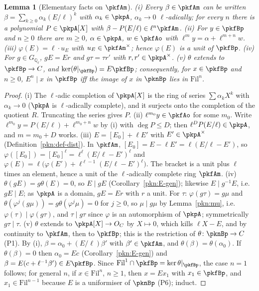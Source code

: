 \documentclass[10pt]{amsart}
\newtheorem{lemma}[theorem]{Lemma}
\theoremstyle{definition}
\theoremstyle{remark}
\newcommand{\Q}{\mathbb Q}
\begin{document}
\begin{lemma}[Elementary facts on $\pkfAm$]\label{pkf:approx0}
(i) Every $\beta\in\pkfAm$ can be written $\beta=\sum_{k\ge0}\alpha_k(E/\ell)^k$ with $\alpha_k\in\pkpA$,
$\alpha_k\to0$ $\ell$-adically; for every $n$ there is a polynomial $P\in\pkpA[X]$ with
$\beta-P(E/\ell)\in\ell^n\pkfAm$. (ii) For $y\in\pkfBp$ and $n\ge0$ there are $m\ge0$, $\alpha\in\pkpA$,
$w\in\pkfAo$ with $\ell^my=\alpha+\ell^{m+n}w$. (iii) $\varphi(E)=\ell\cdot u_E$ with
$u_E\in\pkfAm^\times$; hence $\varphi(E)$ is a unit of $\pkfBp$. (iv) For $g\in G_{\Q_\ell}$, $gE=Er$ and
$g\tau=\tau r'$ with $r,r'\in\pkpA^\times$. (v) $\theta$ extends to $\pkfBp\to C$, and
$\ker(\theta|_{\pkfBp})=E\pkfBp$; consequently, for $x\in\pkfBp$ and $n\ge0$, $E^n\mid x$ in $\pkfBp$
iff the image of $x$ in $\pknBp$ lies in $\mathrm{Fil}^n$.
\end{lemma}

\begin{proof}
(i) The $\ell$-adic completion of $\pkpA[X]$ is the ring of series $\sum\alpha_kX^k$ with $\alpha_k\to0$
($\pkpA$ is $\ell$-adically complete), and it surjects onto the completion of the quotient $R$.
Truncating the series gives $P$.
(ii) $\ell^{m_0}y\in\pkfAo$ for some $m_0$. Write $\ell^{m_0}y=P(E/\ell)+\ell^{m_0+n}w$ by (i) with
$\deg P\le D$; then $\ell^DP(E/\ell)\in\pkpA$, and $m=m_0+D$ works.
(iii) $E=[E_0]+\ell E'$ with $E'\in\pkpA^\times$ (Definition~\ref{pkn:def-dist}). In $\pkfAm$,
$[E_0]=E-\ell E'=\ell(E/\ell-E')$, so $\varphi([E_0])=[E_0]^\ell=\ell^\ell(E/\ell-E')^\ell$ and
$\varphi(E)=\ell\bigl(\varphi(E')+\ell^{\ell-1}(E/\ell-E')^\ell\bigr)$. The bracket is a unit plus $\ell$
times an element, hence a unit of the $\ell$-adically complete ring $\pkfAm$.
(iv) $\theta(gE)=g\theta(E)=0$, so $E\mid gE$ (Corollary~\ref{pkn:E-gen}); likewise $E\mid g^{-1}E$,
i.e.\ $gE\mid E$; as $\pkpA$ is a domain, $gE=Er$ with $r$ a unit. For $\tau$: $\varphi(g\tau)=g\mu$ and
$\theta(\varphi^j(g\mu))=g\theta(\varphi^j\mu)=0$ for $j\ge0$, so $\mu\mid g\mu$ by Lemma~\ref{pkn:mu},
i.e.\ $\varphi(\tau)\mid\varphi(g\tau)$, and $\tau\mid g\tau$ since $\varphi$ is an automorphism of $\pkpA$;
symmetrically $g\tau\mid\tau$.
(v) $\theta$ extends to $\pkpA[X]\to O_C$ by $X\mapsto0$, which kills $\ell X-E$, and by continuity to
$\pkfAm$, then to $\pkfBp$; this is the restriction of $\theta\colon\pknBp\to C$ (P1). By (i),
$\beta=\alpha_0+(E/\ell)\beta'$ with $\beta'\in\pkfAm$, and $\theta(\beta)=\theta(\alpha_0)$. If
$\theta(\beta)=0$ then $\alpha_0=Ec$ (Corollary~\ref{pkn:E-gen}) and $\beta=E(c+\ell^{-1}\beta')\in
E\pkfBp$. Since $\mathrm{Fil}^1\cap\pkfBp=\ker\theta|_{\pkfBp}$, the case $n=1$ follows; for general $n$,
if $x\in\mathrm{Fil}^n$, $n\ge1$, then $x=Ex_1$ with $x_1\in\pkfBp$, and $x_1\in\mathrm{Fil}^{n-1}$
because $E$ is a uniformiser of $\pknBp$ (P6); induct.
\end{proof}
\end{document}
